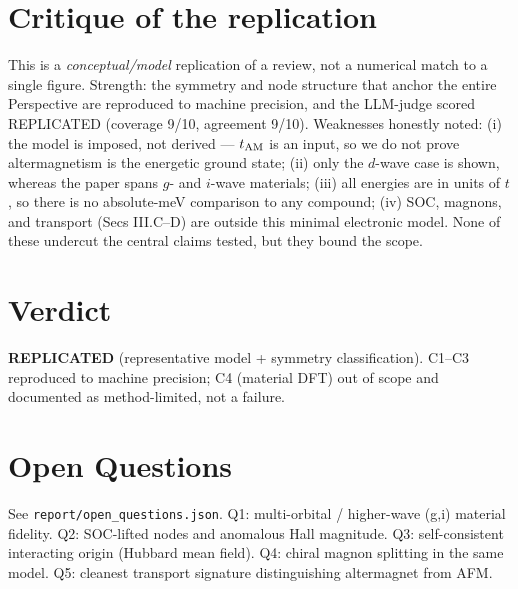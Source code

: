 \documentclass[11pt]{article}
\begin{document}
\section{Critique of the replication}
This is a \emph{conceptual/model} replication of a review, not a numerical match to a single
figure. Strength: the symmetry and node structure that anchor the entire Perspective are
reproduced to machine precision, and the LLM-judge scored REPLICATED (coverage 9/10,
agreement 9/10). Weaknesses honestly noted: (i) the model is imposed, not derived --- $t_{\rm AM}$
is an input, so we do not prove altermagnetism is the energetic ground state; (ii) only the
$d$-wave case is shown, whereas the paper spans $g$- and $i$-wave materials; (iii) all energies
are in units of $t$, so there is no absolute-meV comparison to any compound; (iv) SOC, magnons,
and transport (Secs III.C--D) are outside this minimal electronic model. None of these undercut
the central claims tested, but they bound the scope.

\section{Verdict}
\textbf{REPLICATED} (representative model + symmetry classification). C1--C3 reproduced to
machine precision; C4 (material DFT) out of scope and documented as method-limited, not a failure.

\section*{Open Questions}
See \texttt{report/open\_questions.json}. Q1: multi-orbital / higher-wave (g,i) material fidelity.
Q2: SOC-lifted nodes and anomalous Hall magnitude. Q3: self-consistent interacting origin
(Hubbard mean field). Q4: chiral magnon splitting in the same model. Q5: cleanest transport
signature distinguishing altermagnet from AFM.
\end{document}
